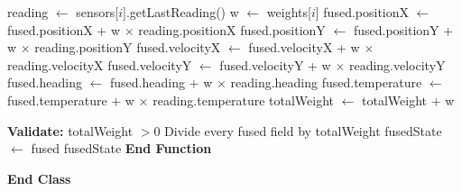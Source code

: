 \documentclass[a4paper,11pt]{article}
\begin{document}
\begin{algorithm}[H]
\begin{algorithmic}[1]
\vspace{0.15cm}
\State \hspace{1.5cm} 
\State \hspace{2cm} reading $\leftarrow$ sensors[$i$].getLastReading()
\State \hspace{2cm} w $\leftarrow$ weights[$i$]
\State \hspace{2cm} fused.positionX $\leftarrow$ fused.positionX + w $\times$ reading.positionX
\State \hspace{2cm} fused.positionY $\leftarrow$ fused.positionY + w $\times$ reading.positionY
\State \hspace{2cm} fused.velocityX $\leftarrow$ fused.velocityX + w $\times$ reading.velocityX
\State \hspace{2cm} fused.velocityY $\leftarrow$ fused.velocityY + w $\times$ reading.velocityY
\State \hspace{2cm} fused.heading $\leftarrow$ fused.heading + w $\times$ reading.heading
\State \hspace{2cm} fused.temperature $\leftarrow$ fused.temperature + w $\times$ reading.temperature
\State \hspace{2cm} totalWeight $\leftarrow$ totalWeight + w
\State \hspace{1.5cm} \EndFor

\vspace{0.15cm}
\State \hspace{1.5cm} \textbf{Validate:} totalWeight $> 0$
\State \hspace{1.5cm} Divide every fused field by totalWeight 
\State \hspace{1.5cm} fusedState $\leftarrow$ fused
\State \hspace{1.5cm} \Return fusedState
\State \hspace{1cm} \textbf{End Function}

\State \textbf{End Class}

\end{algorithmic}
\end{algorithm}
\end{document}
